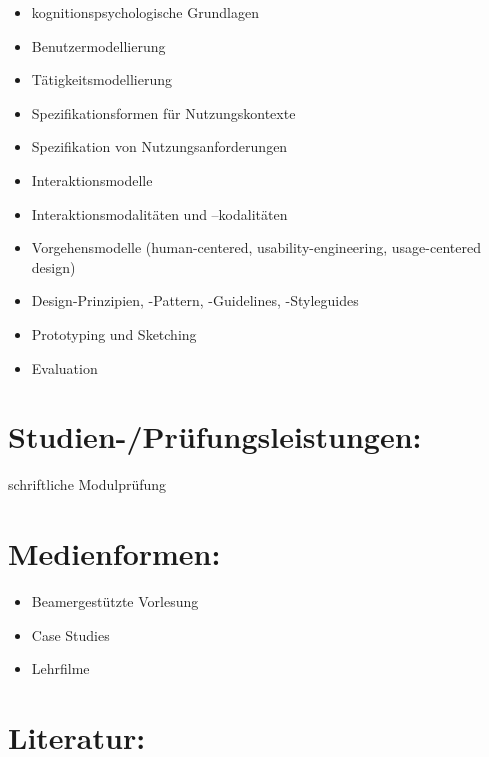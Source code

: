 \begin{itemize}
\item
  kognitionspsychologische Grundlagen
\item
  Benutzermodellierung
\item
  Tätigkeitsmodellierung
\item
  Spezifikationsformen für Nutzungskontexte
\item
  Spezifikation von Nutzungsanforderungen
\item
  Interaktionsmodelle
\item
  Interaktionsmodalitäten und --kodalitäten
\item
  Vorgehensmodelle (human-centered, usability-engineering,
  usage-centered design)
\item
  Design-Prinzipien, -Pattern, -Guidelines, -Styleguides
\item
  Prototyping und Sketching
\item
  Evaluation
\end{itemize}

\section*{Studien-/Prüfungsleistungen:}\label{studien-pruxfcfungsleistungen-10}

schriftliche Modulprüfung

\section*{Medienformen:}\label{medienformen-6}

\begin{itemize}
\item
  Beamergestützte Vorlesung
\item
  Case Studies
\item
  Lehrfilme
\end{itemize}

\section*{Literatur:}\label{literatur-12}

